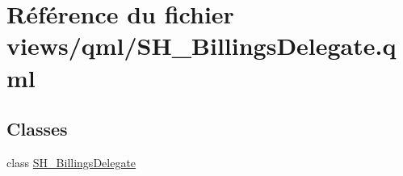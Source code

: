 \hypertarget{SH__BillingsDelegate_8qml}{\section{Référence du fichier views/qml/\-S\-H\-\_\-\-Billings\-Delegate.qml}
\label{SH__BillingsDelegate_8qml}
}
\subsection*{Classes}
\begin{DoxyCompactItemize}
\item 
class \hyperlink{classSH__BillingsDelegate}{S\-H\-\_\-\-Billings\-Delegate}
\end{DoxyCompactItemize}
